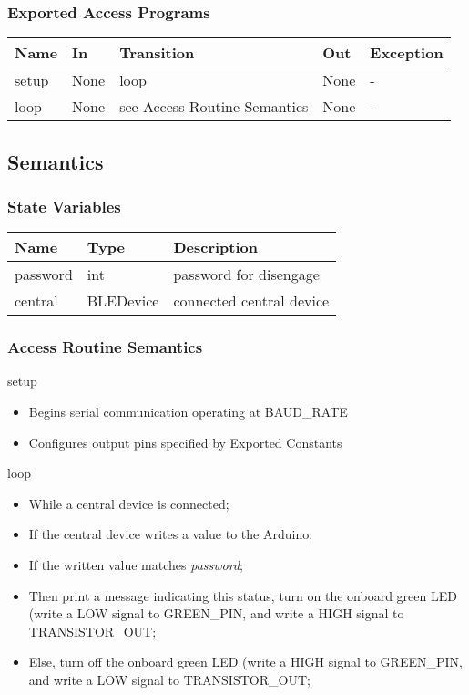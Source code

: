 \documentclass[12pt, titlepage]{article}
\begin{document}
\subsubsection{Exported Access Programs}

\begin{center}
\begin{tabular}{p{2cm} p{2cm} p{4cm} p{2cm} p{2cm}}
\hline
\textbf{Name} & \textbf{In} & \textbf{Transition} & \textbf{Out} & \textbf{Exception} \\
\hline
setup & None & loop & None & - \\
loop & None & see Access Routine Semantics & None & -\\
\hline
\end{tabular}
\end{center}

\subsection{Semantics}

\subsubsection{State Variables}

\begin{center}
\begin{tabular}{p{4cm} p{4cm} p{6cm}}
\hline
\textbf{Name} & \textbf{Type} & \textbf{Description} \\
\hline
password & int & password for disengage \\
central & BLEDevice & connected central device \\
\hline
\end{tabular}
\end{center}

\subsubsection{Access Routine Semantics}

\noindent setup
\begin{itemize}
\item Begins serial communication operating at BAUD\_RATE
\item Configures output pins specified by Exported Constants
\end{itemize}

\noindent loop
\begin{itemize}
\item While a central device is connected;
\item If the central device writes a value to the Arduino;
\item If the written value matches \textit{password};
\item Then print a message indicating this status, turn on the onboard green LED (write a LOW signal to GREEN\_PIN, and write a HIGH signal to TRANSISTOR\_OUT;
\item Else, turn off the onboard green LED (write a HIGH signal to GREEN\_PIN, and write a LOW signal to TRANSISTOR\_OUT;
\end{itemize}
\end{document}
